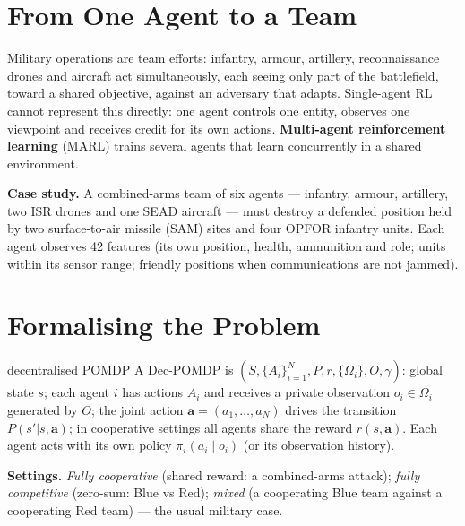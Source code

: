 \documentclass[11pt]{article}
\begin{document}
\tableofcontents
\newpage

\section{From One Agent to a Team}
Military operations are team efforts: infantry, armour, artillery, reconnaissance drones and aircraft act simultaneously, each seeing only part of the battlefield, toward a shared objective, against an adversary that adapts. Single-agent RL cannot represent this directly: one agent controls one entity, observes one viewpoint and receives credit for its own actions. \textbf{Multi-agent reinforcement learning} (MARL) trains several agents that learn concurrently in a shared environment.

\textbf{Case study.} A combined-arms team of six agents --- infantry, armour, artillery, two ISR drones and one SEAD aircraft --- must destroy a defended position held by two surface-to-air missile (SAM) sites and four OPFOR infantry units. Each agent observes 42 features (its own position, health, ammunition and role; units within its sensor range; friendly positions when communications are not jammed).

\section{Formalising the Problem}
\begin{definition}{decentralised POMDP}
A Dec-POMDP is $(S,\{A_i\}_{i=1}^N,P,r,\{\Omega_i\},O,\gamma)$: global state $s$; each agent $i$ has actions $A_i$ and receives a private observation $o_i\in\Omega_i$ generated by $O$; the joint action $\mathbf a=(a_1,\ldots,a_N)$ drives the transition $P(s'|s,\mathbf a)$; in cooperative settings all agents share the reward $r(s,\mathbf a)$. Each agent acts with its own policy $\pi_i(a_i\mid o_i)$ (or its observation history).
\end{definition}
\textbf{Settings.} \emph{Fully cooperative} (shared reward: a combined-arms attack); \emph{fully competitive} (zero-sum: Blue vs Red); \emph{mixed} (a cooperating Blue team against a cooperating Red team) --- the usual military case.
\end{document}

